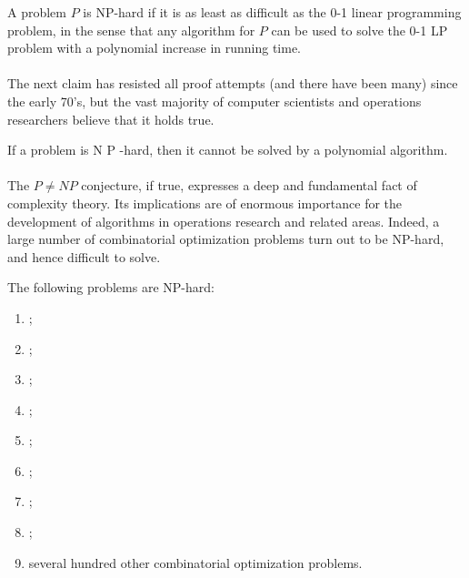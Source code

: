 \begin{definition}[NP-hard]
A problem $P$ is NP-hard if it is as least as difficult as the 0-1 linear programming problem, in the sense that any algorithm for $P$ can be used to solve the 0-1 LP problem with a polynomial increase in running time.
\end{definition}

\paragraph{}
The next claim has resisted all proof attempts (and there have been many) since the early 70's, but the vast majority of computer scientists and operations researchers believe that it holds true.

\begin{conjecture}[$P\neq NP$]
If a problem is N P -hard, then it cannot be solved by a polynomial algorithm.
\end{conjecture}

\paragraph{}
The $P\neq NP$ conjecture, if true, expresses a deep and fundamental fact of complexity theory. Its implications are of enormous importance for the development of algorithms in operations research and related areas. Indeed, a large number of combinatorial optimization problems turn out to be NP-hard, and hence difficult to solve.

\begin{proposition}
The following problems are NP-hard:
\begin{enumerate}
 \item {};
 \item {};
 \item {};
 \item {};
 \item {};
 \item {};
 \item {};
 \item {};
 \item several hundred other combinatorial optimization problems.
\end{enumerate}
\end{proposition}

